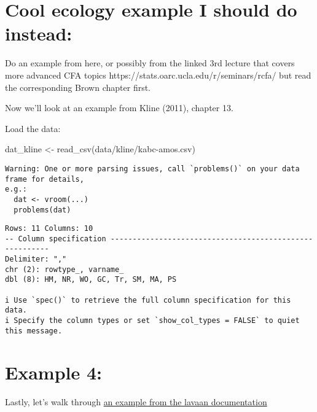 \documentclass[
  letterpaper,
  DIV=11,
  numbers=noendperiod]{scrreprt}
\newenvironment{Shaded}{\begin{snugshade}}{\end{snugshade}}
\newcommand{\FunctionTok}[1]{\textcolor[rgb]{0.28,0.35,0.67}{#1}}
\newcommand{\NormalTok}[1]{\textcolor[rgb]{0.00,0.23,0.31}{#1}}
\newcommand{\OtherTok}[1]{\textcolor[rgb]{0.00,0.23,0.31}{#1}}
\newcommand{\StringTok}[1]{\textcolor[rgb]{0.13,0.47,0.30}{#1}}
\begin{document}
\hypertarget{cool-ecology-example-i-should-do-instead}{%
\section*{Cool ecology example I should do
instead:}\label{cool-ecology-example-i-should-do-instead}}


Do an example from here, or possibly from the linked 3rd lecture that
covers more advanced CFA topics
https://stats.oarc.ucla.edu/r/seminars/rcfa/ but read the corresponding
Brown chapter first.

Now we'll look at an example from Kline (2011), chapter 13.

Load the data:

\begin{Shaded}
\begin{Highlighting}[]
\NormalTok{dat\_kline }\OtherTok{\textless{}{-}} \FunctionTok{read\_csv}\NormalTok{(}\StringTok{\textquotesingle{}data/kline/kabc{-}amos.csv\textquotesingle{}}\NormalTok{)}
\end{Highlighting}
\end{Shaded}

\begin{verbatim}
Warning: One or more parsing issues, call `problems()` on your data frame for details,
e.g.:
  dat <- vroom(...)
  problems(dat)
\end{verbatim}

\begin{verbatim}
Rows: 11 Columns: 10
-- Column specification --------------------------------------------------------
Delimiter: ","
chr (2): rowtype_, varname_
dbl (8): HM, NR, WO, GC, Tr, SM, MA, PS

i Use `spec()` to retrieve the full column specification for this data.
i Specify the column types or set `show_col_types = FALSE` to quiet this message.
\end{verbatim}

\hypertarget{example-4}{%
\section{Example 4:}\label{example-4}}

Lastly, let's walk through
\href{https://www.lavaan.ugent.be/tutorial/cfa.html}{an example from the
lavaan documentation}
\end{document}
